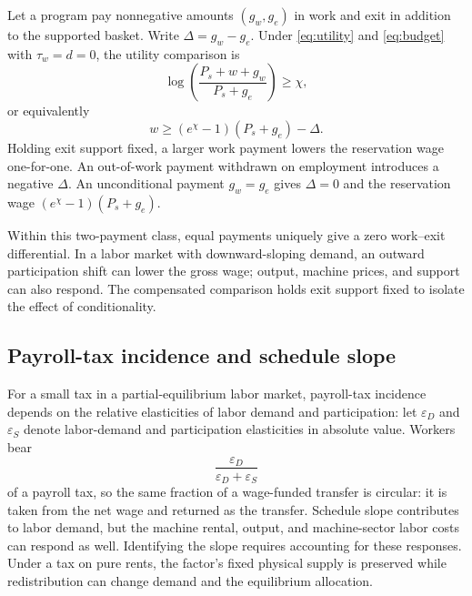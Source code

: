 \documentclass[12pt]{article}
\theoremstyle{plain}
\theoremstyle{definition}
\theoremstyle{remark}
\begin{document}
Let a program pay nonnegative amounts $(g_w,g_e)$ in work and exit in addition to the supported basket. Write $\Delta=g_w-g_e$. Under \eqref{eq:utility} and \eqref{eq:budget} with $\tau_w=d=0$, the utility comparison is
\[
\log\left(\frac{P_s+w+g_w}{P_s+g_e}\right)\ge\chi,
\]
or equivalently
\begin{equation}\label{eq:27}
w\ge(e^\chi-1)(P_s+g_e)-\Delta.
\end{equation}
Holding exit support fixed, a larger work payment lowers the reservation wage one-for-one. An out-of-work payment withdrawn on employment introduces a negative $\Delta$. An unconditional payment $g_w=g_e$ gives $\Delta=0$ and the reservation wage $(e^\chi-1)(P_s+g_e)$.

Within this two-payment class, equal payments uniquely give a zero work--exit differential. In a labor market with downward-sloping demand, an outward participation shift can lower the gross wage; output, machine prices, and support can also respond. The compensated comparison holds exit support fixed to isolate the effect of conditionality.

\subsection{Payroll-tax incidence and schedule slope}\label{app:D.2}

For a small tax in a partial-equilibrium labor market, payroll-tax incidence depends on the relative elasticities of labor demand and participation: let $\varepsilon_D$ and $\varepsilon_S$ denote labor-demand and participation elasticities in absolute value. Workers bear
\[
\frac{\varepsilon_D}{\varepsilon_D+\varepsilon_S}
\]
of a payroll tax, so the same fraction of a wage-funded transfer is circular: it is taken from the net wage and returned as the transfer. Schedule slope contributes to labor demand, but the machine rental, output, and machine-sector labor costs can respond as well. Identifying the slope requires accounting for these responses. Under a tax on pure rents, the factor's fixed physical supply is preserved while redistribution can change demand and the equilibrium allocation.
\end{document}
